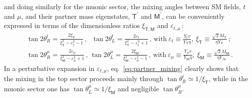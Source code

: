 and doing similarly for the muonic sector, the mixing angles between SM fields, $t$ and $\mu$,  and their partner mass eigenstates, $\mathsf{T}^{\prime}$ and $\mathsf{M}^{\prime}$, can be conveniently expressed in terms of the dimensionless ratios $\xi_{\mathsf{T,M}}$ and $\varepsilon_{t,\mu}\, $:
\begin{eqnarray}
	\label{eq:partner_mixing}
	& \  \tan 2 \theta_{R}^{t} = \frac{2 \xi_{\mathsf{T}}}{\xi_{\mathsf{T}}^2-\varepsilon_{t}^2-1} \, , \, 
	\ \, \tan 2 \theta_{L}^{t} = \frac{2 \varepsilon_{t}}{\xi_{\mathsf{T}}^2-\varepsilon_{t}^2 +1} \, , \,   \textrm{with} \ \varepsilon_{t} \equiv \frac{Y_{t} v}{Y_{\mathsf{T}} \eta},~\xi_{\mathsf{T}} \equiv \frac{\sqrt{2} M_{\mathsf{T}}}{\eta Y_{\mathsf{T}}} \, ; \ \\
	& \  \tan 2 \theta_{R}^{\mu} = \frac{2 \varepsilon_{\mu}}{\xi_{\mathsf{M}}^2-\varepsilon_{\mu}^2+1} \, , \, 
	\tan 2 \theta_{L}^{\mu} = \frac{2 \xi_{\mathsf{M}}}
	{\xi_{\mathsf{M}}^2-\varepsilon_{\mu}^2 -1}  \, , \, 
	\textrm{with} \ \varepsilon_{\mu} \equiv \frac{Y_{\mu} v}{Y_{\mathsf{M}} \eta},~\xi_{\mathsf{M}} \equiv \frac{\sqrt{2} M_{\mathsf{M}}}{\eta Y_{\mathcal{M}}} \, .
	\nonumber
\end{eqnarray}
In a perturbative expansion in $\varepsilon_{t,\mu}$, eq.~\eqref{eq:partner_mixing} clearly shows that the mixing in the top sector proceeds mainly through $\tan\theta^{t}_{R} \simeq 1/\xi_{\mathsf{T}}$, while in the muonic sector one has  $\tan\theta^{\mu}_{L} \simeq 1/\xi_{\mathsf{M}}$ and negligible $\tan\theta^{\mu}_{R}$.

